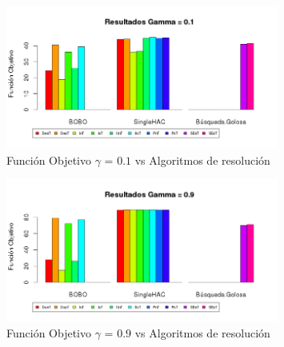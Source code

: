 \begin{figure}[H]
  \centering
    \includegraphics[width=0.8\textwidth]{resultados/papers/Graficos_agrupados/gamma01.png}
  \caption{Función Objetivo $\gamma$ = $0.1$ vs Algoritmos de resolución}
  \label{res:img-papers-agr-gamma01}
\end{figure}

\begin{figure}[H]
  \centering
    \includegraphics[width=0.8\textwidth]{resultados/papers/Graficos_agrupados/gamma09.png}
  \caption{Función Objetivo $\gamma$ = $0.9$ vs Algoritmos de resolución}
  \label{res:img-papers-agr-gamma09}
\end{figure}

